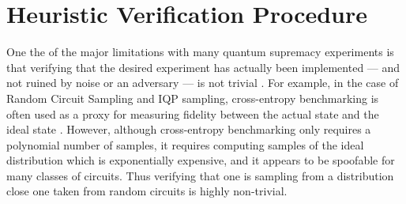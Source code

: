 \documentclass[a4paper,onecolumn,11pt,accepted=2017-05-09]{quantumarticle}
\begin{document}
  \section{Heuristic Verification Procedure }
 \label{Sec:Verification}

 One the of the major limitations with many quantum supremacy experiments is that verifying that the desired experiment has actually been implemented --- and not ruined by noise or an adversary --- is not trivial \cite{hangleiter2019sample}.
 For example, in the case of Random Circuit Sampling and IQP sampling, cross-entropy benchmarking is often used as a proxy for measuring fidelity between the actual state and the ideal state \cite{boixo2018characterizing,hangleiter2024fault}. 
 However, although cross-entropy benchmarking only requires a polynomial number of samples, it requires computing samples of the ideal distribution which is exponentially expensive, and it appears to be spoofable for many classes of circuits.
 Thus verifying that one is sampling from a distribution close one taken from random circuits is highly non-trivial.
\end{document}
